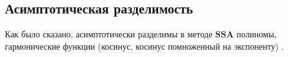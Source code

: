 \documentclass[a4paper, 11pt]{article}
\newcommand{\SSA}{\textbf{SSA}}
\newcommand{\CISSA}{\textbf{CiSSA}}
\newcommand{\TS}{\mathsf{X}}
\begin{document}
%		
%
%		





\subsection{Асимптотическая разделимость}
\label{subsubsec:asymp}
Как было сказано, асимптотически разделимы в методе $\SSA$ полиномы, гармонические функции (косинус, косинус помноженный на экспоненту) \cite{golyandina2001analysis}. 
\end{document}
